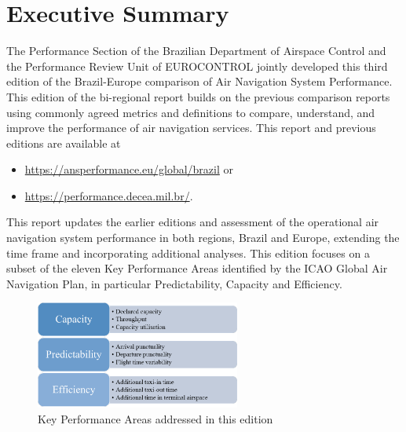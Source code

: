 \documentclass[
  a4paper,
  DIV=11,
  numbers=noendperiod]{scrreport}
\providecommand{\tightlist}{%
  \setlength{\itemsep}{0pt}\setlength{\parskip}{0pt}}\usepackage{longtable,booktabs,array}
\begin{document}

\hypertarget{executive-summary}{%
\chapter*{Executive Summary}\label{executive-summary}}


The Performance Section of the Brazilian Department of Airspace Control
and the Performance Review Unit of EUROCONTROL jointly developed this
third edition of the Brazil-Europe comparison of Air Navigation System
Performance. This edition of the bi-regional report builds on the
previous comparison reports using commonly agreed metrics and
definitions to compare, understand, and improve the performance of air
navigation services. This report and previous editions are available at

\begin{itemize}
\tightlist
\item
  \url{https://ansperformance.eu/global/brazil} or
\item
  \url{https://performance.decea.mil.br/}.
\end{itemize}

This report updates the earlier editions and assessment of the
operational air navigation system performance in both regions, Brazil
and Europe, extending the time frame and incorporating additional
analyses. This edition focuses on a subset of the eleven Key Performance
Areas identified by the ICAO Global Air Navigation Plan, in particular
Predictability, Capacity and Efficiency.

\begin{figure}[H]

{\centering \includegraphics[width=0.6\textwidth,height=\textheight]{././figures/scope-KPA-and-KPI.png}

}

\caption{\label{fig-scope-KPAs-KPIs}Key Performance Areas addressed in
this edition}

\end{figure}
\end{document}
